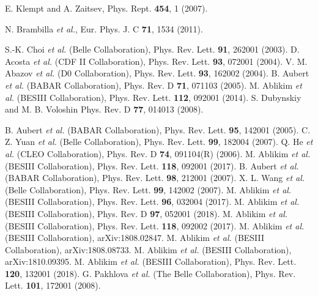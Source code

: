 \documentclass{jps-cp}
\begin{document}


\begin{thebibliography}{9}

  E. Klempt and A. Zaitsev, Phys. Rept. \textbf{454}, 1 (2007).

 N. Brambilla {\em et al.}, Eur. Phys. J. C \textbf{71}, 1534 (2011).

 S.-K. Choi {\em et al.} (Belle Collaboration), Phys. Rev. Lett. \textbf{91}, 262001 (2003).
 D. Acosta {\em et al.} (CDF II Collaboration), Phys. Rev. Lett. \textbf{93}, 072001 (2004).
 V. M. Abazov {\em et al.} (D0 Collaboration), Phys. Rev. Lett. \textbf{93}, 162002 (2004).
 B. Aubert {\em et al.} (BABAR Collaboration), Phys. Rev. D \textbf{71}, 071103 (2005).
 M. Ablikim {\em et al.} (BESIII Collaboration), Phys. Rev. Lett. \textbf{112}, 092001 (2014).
 S. Dubynskiy and M. B. Voloshin Phys. Rev. D \textbf{77}, 014013 (2008).


 B. Aubert {\em et al.} (BABAR Collaboration), Phys. Rev. Lett. \textbf{95}, 142001 (2005).
 C. Z. Yuan {\em et al.} (Belle Collaboration), Phys. Rev. Lett. \textbf{99}, 182004 (2007).
 Q. He {\em et al.} (CLEO Collaboration), Phys. Rev. D \textbf{74}, 091104(R) (2006).
 M. Ablikim {\em et al.} (BESIII Collaboration), Phys. Rev. Lett. \textbf{118}, 092001 (2017).
 B. Aubert {\em et al.} (BABAR Collaboration), Phys. Rev. Lett. \textbf{98}, 212001 (2007).
 X. L. Wang {\em et al.} (Belle Collaboration), Phys. Rev. Lett. \textbf{99}, 142002 (2007).
 M. Ablikim {\em et al.} (BESIII Collaboration), Phys. Rev. Lett. \textbf{96}, 032004 (2017).
 M. Ablikim {\em et al.} (BESIII Collaboration), Phys. Rev. D \textbf{97}, 052001 (2018).
 M. Ablikim {\em et al.} (BESIII Collaboration), Phys. Rev. Lett. \textbf{118}, 092002 (2017).
  M. Ablikim {\em et al.} (BESIII Collaboration), arXiv:1808.02847.
 M. Ablikim {\em et al.} (BESIII Collaboration), arXiv:1808.08733.
 M. Ablikim {\em et al.} (BESIII Collaboration), arXiv:1810.09395.
 M. Ablikim {\em et al.} (BESIII Collaboration), Phys. Rev. Lett. \textbf{120}, 132001 (2018).
 G. Pakhlova {\em et al.} (The Belle Collaboration), Phys. Rev. Lett. \textbf{101}, 172001 (2008).



\end{thebibliography}
\end{document}
